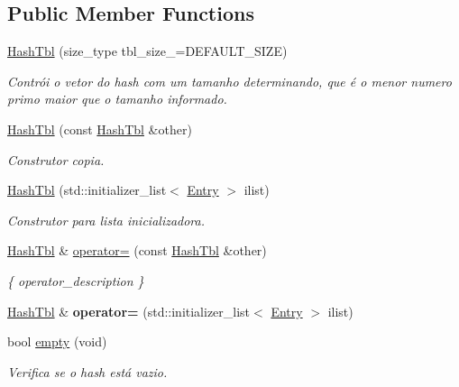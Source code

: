 \subsection*{Public Member Functions}
\begin{DoxyCompactItemize}
\item 
\hyperlink{classac_1_1HashTbl_aec48560515eb829449943d3c2086c4a6}{Hash\+Tbl} (size\+\_\+type tbl\+\_\+size\+\_\+=D\+E\+F\+A\+U\+L\+T\+\_\+\+S\+I\+ZE)
\begin{DoxyCompactList}\small\item\em Contrói o vetor do hash com um tamanho determinando, que é o menor numero primo maior que o tamanho informado. \end{DoxyCompactList}\item 
\hyperlink{classac_1_1HashTbl_a01ae3d3c982c76c68d189515894773c5}{Hash\+Tbl} (const \hyperlink{classac_1_1HashTbl}{Hash\+Tbl} \&other)
\begin{DoxyCompactList}\small\item\em Construtor copia. \end{DoxyCompactList}\item 
\hyperlink{classac_1_1HashTbl_ab88aa3e7c646fe6310bea58097a72dc1}{Hash\+Tbl} (std\+::initializer\+\_\+list$<$ \hyperlink{classac_1_1HashEntry}{Entry} $>$ ilist)
\begin{DoxyCompactList}\small\item\em Construtor para lista inicializadora. \end{DoxyCompactList}\item 
\hyperlink{classac_1_1HashTbl}{Hash\+Tbl} \& \hyperlink{classac_1_1HashTbl_ab0907d777c09da3d1071c30a96939c71}{operator=} (const \hyperlink{classac_1_1HashTbl}{Hash\+Tbl} \&other)
\begin{DoxyCompactList}\small\item\em \{ operator\+\_\+description \} \end{DoxyCompactList}\item 
\mbox{\label{classac_1_1HashTbl_a13febc90fbc2417ec7eff89dd282cd48}} 
\hyperlink{classac_1_1HashTbl}{Hash\+Tbl} \& {\bfseries operator=} (std\+::initializer\+\_\+list$<$ \hyperlink{classac_1_1HashEntry}{Entry} $>$ ilist)
\item 
bool \hyperlink{classac_1_1HashTbl_ae472bbb6b9905b7fb6cb784195fb73ed}{empty} (void)
\begin{DoxyCompactList}\small\item\em Verifica se o hash está vazio. \end{DoxyCompactList}\item 

\end{DoxyCompactItemize}
